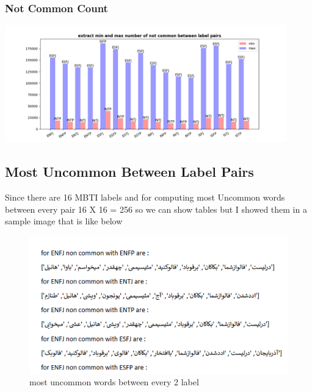 \documentclass[10pt, a4paper]{article}
\begin{document}
\subsubsection{Not Common Count}

\begin{adjustbox}{max width=\textwidth,totalheight=2in}
\end{adjustbox}
\begin{center}
    \includegraphics[width = \textwidth, height=2in]{../stats/not_common_count.png}
\end{center}

\subsection{Most Uncommon Between Label Pairs}
Since there are 16 MBTI labels and for computing most Uncommon words between every pair 16 X 16 = 256 so we can show tables but I showed them
in a sample image that is like below
\begin{figure}[H]
    \centering
    \includegraphics[width=0.7\linewidth]{../stats/most_uncommon_labels.png}
    \caption{most uncommon words between every 2 label}
\end{figure}
\end{document}

